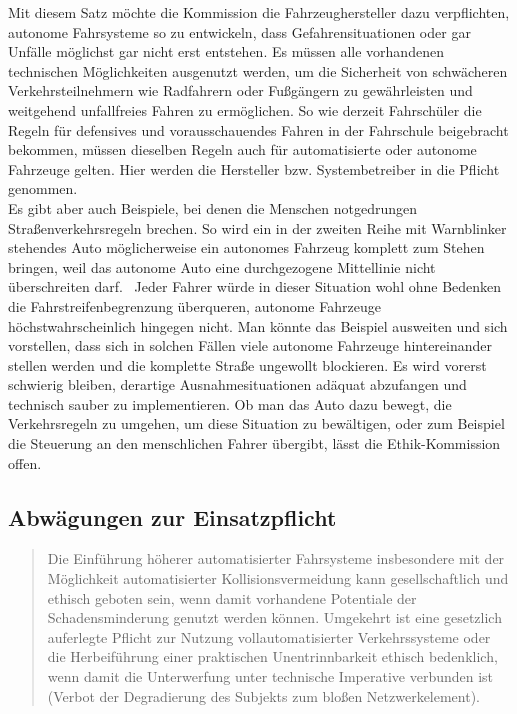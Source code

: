 \documentclass[twoside,a4paper,12pt]{article}
\begin{document}
Mit diesem Satz möchte die Kommission die Fahrzeughersteller dazu verpflichten, autonome Fahrsysteme so zu entwickeln, dass Gefahrensituationen oder gar Unfälle
möglichst gar nicht erst entstehen. Es müssen alle vorhandenen technischen Möglichkeiten ausgenutzt werden, um die Sicherheit von schwächeren Verkehrsteilnehmern wie
Radfahrern oder Fußgängern zu gewährleisten und weitgehend unfallfreies Fahren zu ermöglichen. So wie derzeit Fahrschüler die Regeln für defensives und
vorausschauendes Fahren in der Fahrschule beigebracht bekommen, müssen dieselben Regeln auch für automatisierte oder autonome Fahrzeuge gelten. Hier werden die Hersteller bzw. Systembetreiber in die Pflicht genommen.\\ 

Es gibt aber auch Beispiele, bei denen die Menschen notgedrungen Straßenverkehrsregeln brechen. So wird ein in der zweiten Reihe mit Warnblinker stehendes Auto
möglicherweise ein autonomes Fahrzeug komplett zum Stehen bringen, weil das autonome Auto eine durchgezogene Mittellinie nicht überschreiten darf.~\cite{zeit1} Jeder Fahrer würde in dieser Situation wohl ohne Bedenken die Fahrstreifenbegrenzung überqueren, autonome Fahrzeuge höchstwahrscheinlich hingegen nicht. Man könnte das
Beispiel ausweiten und sich vorstellen, dass sich in solchen Fällen viele autonome Fahrzeuge hintereinander stellen werden und die komplette Straße ungewollt blockieren. Es wird vorerst schwierig bleiben, derartige Ausnahmesituationen adäquat abzufangen und technisch sauber zu implementieren. Ob man das Auto dazu bewegt, die
Verkehrsregeln zu umgehen, um diese Situation zu bewältigen, oder zum Beispiel die Steuerung an den menschlichen Fahrer übergibt, lässt die Ethik-Kommission offen.\\ 

\subsection{Abwägungen zur Einsatzpflicht} \label{AbwaegungenZurEinsatzpflicht}

\begin{quote}
\glqq
Die Einführung höherer automatisierter Fahrsysteme insbesondere mit der Möglichkeit
automatisierter Kollisionsvermeidung kann gesellschaftlich und ethisch geboten sein,
wenn damit vorhandene Potentiale der Schadensminderung genutzt werden können.
Umgekehrt ist eine gesetzlich auferlegte Pflicht zur Nutzung vollautomatisierter Verkehrssysteme oder die Herbeiführung 
einer praktischen Unentrinnbarkeit ethisch bedenklich, wenn damit die Unterwerfung unter technische Imperative verbunden 
ist (Verbot der Degradierung des Subjekts zum bloßen Netzwerkelement).\grqq\mbox{~\cite[S. 11]{ek}}
\end{quote}
\end{document}
